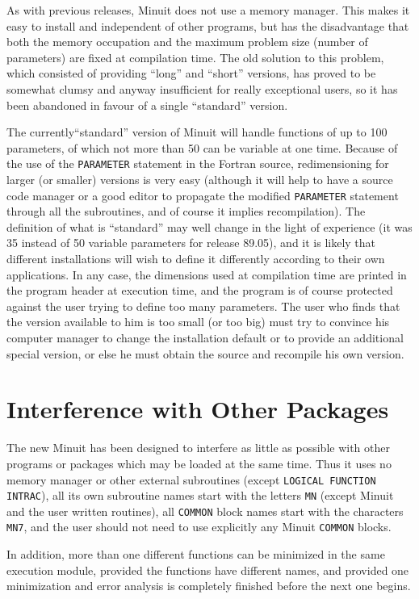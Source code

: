 As with previous releases, Minuit does not use a memory manager.
This makes it easy to install and independent of other programs,
but has the disadvantage that both the memory occupation and the
maximum problem size (number of parameters) are fixed at compilation
time.
The old solution to this problem, which consisted of providing
``long'' and ``short'' versions, has proved to be somewhat clumsy and
anyway insufficient for really exceptional users, so it has been
abandoned in favour of a single ``standard'' version.
 
The currently``standard'' version of Minuit
will handle functions of up to 100
parameters, of which not more than 50 can be variable at one time.
Because of the use of the \texttt{PARAMETER} statement in the Fortran source,
redimensioning for larger (or smaller) versions is very easy
(although it will help to have a source code manager or a good editor
to propagate the modified \texttt{PARAMETER} statement through all the
subroutines, and of course it implies recompilation).
The definition of what is ``standard'' may well change in the light of
experience (it was 35 instead of 50 variable parameters for
release 89.05),
and it is likely that different installations will wish
to define it differently according to their own applications.
In any case, the dimensions used at compilation time are printed
in the program header at execution time, and the program is of course
protected against the user trying to define too many parameters.
The user who finds that the version available to him is too small
(or too big) must try to convince his computer manager to change the
installation default or to provide an additional special version,
or else he must obtain the source and recompile his own version.
\section{Interference with Other Packages}
The new Minuit has been designed to interfere as little as possible
with other programs or packages which may be loaded at the same
time. Thus it uses no memory manager or other external subroutines
(except \texttt{LOGICAL FUNCTION INTRAC}), all its own subroutine names
start with the letters \texttt{MN}
(except Minuit and the user written routines),
all \texttt{COMMON} block names start with the characters \texttt{MN7},
and the user should not need to use explicitly any
Minuit \texttt{COMMON} blocks.
 
In addition, more than one different functions can be minimized in the
same execution module, provided the functions have different names,
and provided one minimization and error analysis is completely
finished before the next one begins.

